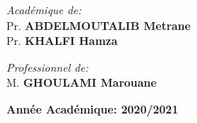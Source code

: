 \begin{titlepage}
\begin{minipage}{0.4\textwidth}
 \begin{flushleft}
 	\centering
    \emph{Académique de:} \\[0.5cm]
    Pr. \textbf{\textsc{ABDELMOUTALIB} Metrane}\\
	Pr. \textbf{\textsc{KHALFI} Hamza}\\
 \end{flushleft}
\end{minipage}\hfill
\noindent
\begin{minipage}{0.4\textwidth}
 \begin{flushright}
 	\centering
    \emph{Professionnel de:} \\[0.5cm]
     M. \textbf{\textsc{GHOULAMI} Marouane}\\
  \end{flushright}
\end{minipage}
\vfill
\centering



\vfill
{\large \textbf{Année Académique: 2020/2021}}

\end{titlepage}
